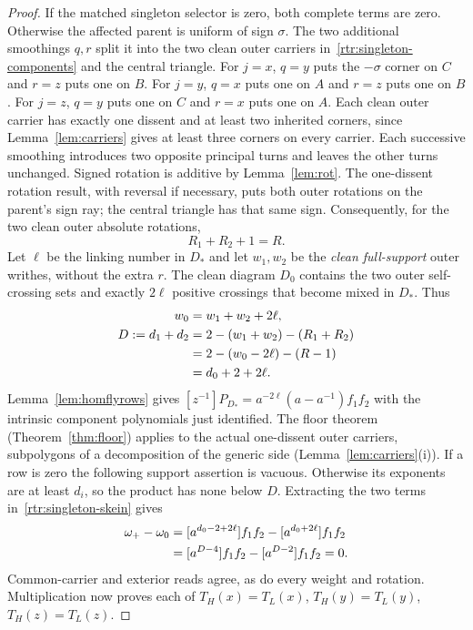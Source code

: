 \begin{proof}
If the matched singleton selector is zero, both complete terms are
zero. Otherwise the affected parent is uniform of sign $\sigma$.
The two additional smoothings $q,r$ split it into the two clean outer
carriers in~\eqref{rtr:singleton-components} and the central triangle.
For $j=x$, $q=y$ puts the $-\sigma$ corner on $C$ and $r=z$ puts
one on $B$. For $j=y$, $q=x$ puts one on $A$ and $r=z$ puts one
on $B$. For $j=z$, $q=y$ puts one on $C$ and $r=x$ puts one on
$A$. Each clean outer carrier has exactly one dissent and at least
two inherited corners, since Lemma~\ref{lem:carriers} gives at least
three corners on every carrier. Each successive smoothing introduces
two opposite principal turns and leaves the other turns unchanged.
Signed rotation is additive by Lemma~\ref{lem:rot}. The one-dissent
rotation result, with reversal if necessary, puts both outer rotations
on the parent's sign ray; the central triangle has that same sign.
Consequently, for the two clean outer absolute rotations,
\begin{equation}\label{rtr:singleton-rotation}
 R_1+R_2+1=R.
\end{equation}
Let $\ell$ be the linking number in $D_*$ and let $w_1,w_2$ be
the \emph{clean full-support} outer writhes, without the extra $r$.
The clean diagram $D_0$ contains the two outer self-crossing sets
and exactly $2\ell$ positive crossings that become mixed in $D_*$.
Thus
\begin{align}
 w_0&=w_1+w_2+2\ell,\notag\\
 D:=d_1+d_2
 &=2-(w_1+w_2)-(R_1+R_2)\notag\\
 &=2-(w_0-2\ell)-(R-1)\notag\\
 &=d_0+2+2\ell.\label{rtr:singleton-slot}
\end{align}
Lemma~\ref{lem:homflyrows} gives
$[z^{-1}]P_{D_*}=a^{-2\ell}(a-a^{-1})f_1f_2$ with the intrinsic
component polynomials just identified. The floor theorem (Theorem~\ref{thm:floor}) applies to
the actual one-dissent outer carriers, subpolygons of a decomposition of
the generic side (Lemma~\ref{lem:carriers}(i)). If a row is zero
the following support assertion is vacuous. Otherwise its exponents
are at least $d_i$, so the product has none below $D$. Extracting
the two terms in~\eqref{rtr:singleton-skein} gives
\begin{align}
 \omega_+-\omega_0
 &= [a^{d_0-2+2\ell}]f_1f_2
       -[a^{d_0+2\ell}]f_1f_2\notag\\
 &= [a^{D-4}]f_1f_2-[a^{D-2}]f_1f_2=0.
 \label{rtr:singleton-result}
\end{align}
Common-carrier and exterior reads agree, as do every weight and
rotation. Multiplication now proves each of
$T_H(x)=T_L(x)$, $T_H(y)=T_L(y)$, $T_H(z)=T_L(z)$.


\end{proof}
